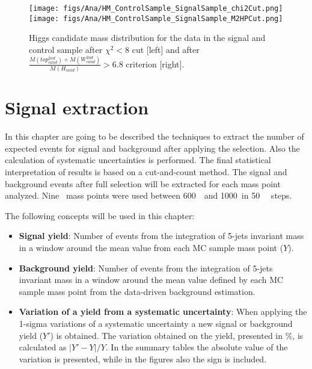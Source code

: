 \begin{figure}[!Hhtbp]
  \begin{center}
    \texttt{[image: figs/Ana/HM\_ControlSample\_SignalSample\_chi2Cut.png]}
    \texttt{[image: figs/Ana/HM\_ControlSample\_SignalSample\_M2HPCut.png]}
    \caption{Higgs candidate mass distribution for the data in the signal and control sample after $\chi^{2}<8$ cut [left] and after $\frac{M(top^{2nd}_{cand})+M(W^{2nd}_{cand})}{M(H_{cand})}>6.8$ criterion [right].}
    \label{fig:HiggsMassCSSS}
  \end{center}
\end{figure}

\chapter[Signal extraction]{Signal extraction}
\label{chap:sigexct}

In this chapter are going to be described the techniques to extract the number of expected events for signal and background after applying the selection. Also the calculation of systematic uncertainties is performed. The final statistical interpretation of results is based on a cut-and-count method. The signal and background events after full selection will be extracted for each mass point analyzed. Nine \Tp~mass points were used between 600~\GeVcc~and 1000~\GeVcc in 50~\GeVcc~ steps.

The following concepts will be used in this chapter:
\begin{itemize}
\item \textbf{Signal yield}: Number of events from the integration of 5-jets invariant mass in a window around the mean value from each MC sample mass point ($Y$).
\item \textbf{Background yield}: Number of events from the integration of 5-jets invariant mass in a window around the mean value defined by each MC sample mass point from the data-driven background estimation.
\item \textbf{Variation of a yield from a systematic uncertainty}: When applying the 1-sigma variations of a systematic uncertainty a new signal or background yield ($Y'$) is obtained. The variation obtained on the yield, presented in \%, is calculated as $|Y'-Y|/Y$. In the summary tables the absolute value of the variation is presented, while in the figures also the sign is included.
\end{itemize}

